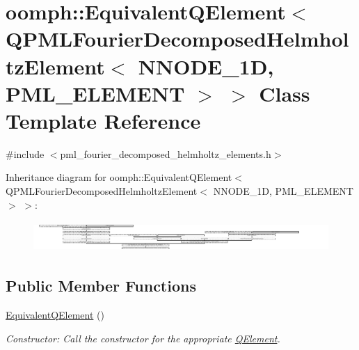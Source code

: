 \hypertarget{classoomph_1_1EquivalentQElement_3_01QPMLFourierDecomposedHelmholtzElement_3_01NNODE__1D_00_01PML__ELEMENT_01_4_01_4}{}\section{oomph\+:\+:Equivalent\+Q\+Element$<$ Q\+P\+M\+L\+Fourier\+Decomposed\+Helmholtz\+Element$<$ N\+N\+O\+D\+E\+\_\+1D, P\+M\+L\+\_\+\+E\+L\+E\+M\+E\+NT $>$ $>$ Class Template Reference}
\label{classoomph_1_1EquivalentQElement_3_01QPMLFourierDecomposedHelmholtzElement_3_01NNODE__1D_00_01PML__ELEMENT_01_4_01_4}


{\ttfamily \#include $<$pml\+\_\+fourier\+\_\+decomposed\+\_\+helmholtz\+\_\+elements.\+h$>$}

Inheritance diagram for oomph\+:\+:Equivalent\+Q\+Element$<$ Q\+P\+M\+L\+Fourier\+Decomposed\+Helmholtz\+Element$<$ N\+N\+O\+D\+E\+\_\+1D, P\+M\+L\+\_\+\+E\+L\+E\+M\+E\+NT $>$ $>$\+:\begin{figure}[H]
\begin{center}
\leavevmode
\includegraphics[height=1.166667cm]{classoomph_1_1EquivalentQElement_3_01QPMLFourierDecomposedHelmholtzElement_3_01NNODE__1D_00_01PML__ELEMENT_01_4_01_4}
\end{center}
\end{figure}
\subsection*{Public Member Functions}
\begin{DoxyCompactItemize}
\item 
\hyperlink{classoomph_1_1EquivalentQElement_3_01QPMLFourierDecomposedHelmholtzElement_3_01NNODE__1D_00_01PML__ELEMENT_01_4_01_4_a555ac994b6550d5973dfcb8bddbfe8cd}{Equivalent\+Q\+Element} ()
\begin{DoxyCompactList}\small\item\em Constructor\+: Call the constructor for the appropriate \hyperlink{classoomph_1_1QElement}{Q\+Element}. \end{DoxyCompactList}\end{DoxyCompactItemize}
